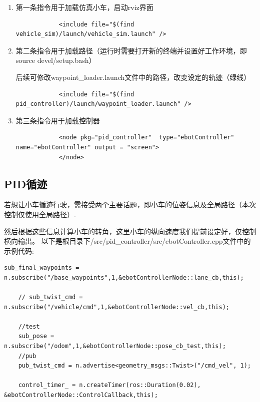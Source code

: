 \documentclass{xjtureport}
\begin{document}
\begin{enumerate}
    \item 第一条指令用于加载仿真小车，启动rviz界面
        \begin{lstlisting}
            <include file="$(find vehicle_sim)/launch/vehicle_sim.launch" />
        \end{lstlisting}
    \item 第二条指令用于加载路径（运行时需要打开新的终端并设置好工作环境，即source devel/setup.bash）
        
    后续可修改waypoint\_loader.launch文件中的路径，改变设定的轨迹（绿线）
        \begin{lstlisting}
            <include file="$(find pid_controller)/launch/waypoint_loader.launch" />
        \end{lstlisting}
    \item 第三条指令用于加载控制器
        \begin{lstlisting}
            <node pkg="pid_controller"  type="ebotController" name="ebotController" output = "screen">
            </node>
        \end{lstlisting}

\end{enumerate}

\subsection{PID循迹}
若想让小车循迹行驶，需接受两个主要话题，即小车的位姿信息及全局路径（本次控制仅使用全局路径）.

然后根据这些信息计算小车的转角，这里小车的纵向速度我们提前设定好，仅控制横向输出。
以下是根目录下/src/pid\_controller/src/ebotController.cpp文件中的示例代码:
\begin{lstlisting}[style=whx]
    sub_final_waypoints = n.subscribe("/base_waypoints",1,&ebotControllerNode::lane_cb,this);

    // sub_twist_cmd = n.subscribe("/vehicle/cmd",1,&ebotControllerNode::vel_cb,this);

    //test
    sub_pose = n.subscribe("/odom",1,&ebotControllerNode::pose_cb_test,this);
    //pub
    pub_twist_cmd = n.advertise<geometry_msgs::Twist>("/cmd_vel", 1);

    control_timer_ = n.createTimer(ros::Duration(0.02), &ebotControllerNode::ControlCallback,this);
\end{lstlisting}
\end{document}
